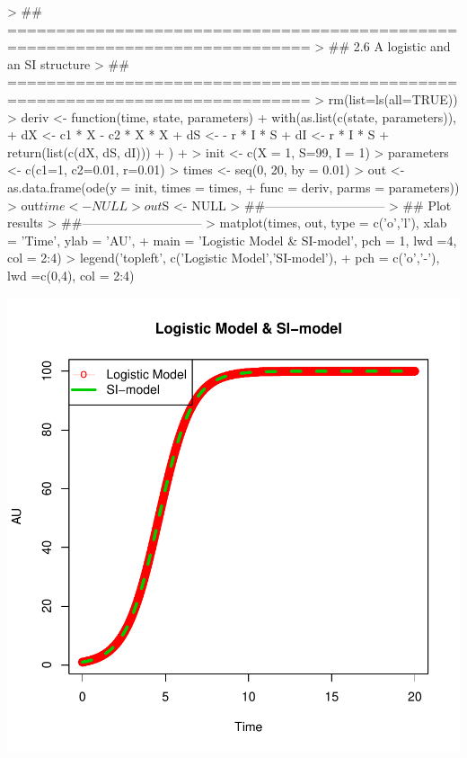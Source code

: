 \documentclass{article}
\begin{document}
\pagebreak
\begin{Schunk}
\begin{Sinput}
> ## =============================================================================
> ## 2.6 A logistic and an SI structure
> ## =============================================================================
> rm(list=ls(all=TRUE)) 
> deriv <- function(time, state, parameters) {
+   with(as.list(c(state, parameters)), {
+     dX <- c1 * X - c2 * X * X
+     dS <-   - r * I * S
+     dI <-     r * I * S
+     return(list(c(dX, dS, dI)))
+   })
+ }
> init <- c(X = 1, S=99, I = 1)
> parameters <- c(c1=1, c2=0.01, r=0.01)
> times <- seq(0, 20, by = 0.01)
> out <- as.data.frame(ode(y = init, times = times,
+                          func = deriv, parms = parameters))
> out$time <- NULL
> out$S <- NULL
> ##-----------------------------
> ## Plot results
> ##-----------------------------
> matplot(times, out, type = c('o','l'), xlab = 'Time', ylab = 'AU', 
+         main = 'Logistic Model & SI-model', pch = 1, lwd =4, col = 2:4)
> legend('topleft', c('Logistic Model','SI-model'), 
+        pch = c('o','-'), lwd =c(0,4), col = 2:4)
\end{Sinput}
\end{Schunk}
\includegraphics{L1-007}
\pagebreak
\end{document}
